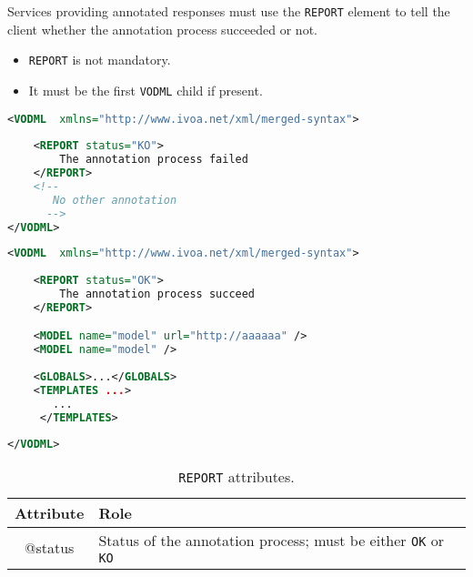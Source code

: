 Services providing annotated responses must use the \texttt{REPORT}  element to tell the client whether the annotation process succeeded or not.

\begin{itemize}
\item \texttt{REPORT} is not mandatory.
\item It must be the first \texttt{VODML} child if present.
\end{itemize}



\begin{lstlisting}[caption={\texttt{REPORT} example for an annotation failure.},language=XML]
<VODML	xmlns="http://www.ivoa.net/xml/merged-syntax">
	
	<REPORT status="KO">
	    The annotation process failed
	</REPORT>
	<!-- 
	   No other annotation
	  -->	
</VODML>
\end{lstlisting}

\begin{lstlisting}[caption={\texttt{REPORT} example for an valid annotation.},language=XML]
<VODML	xmlns="http://www.ivoa.net/xml/merged-syntax">
	
	<REPORT status="OK">
	    The annotation process succeed
	</REPORT>

	<MODEL name="model" url="http://aaaaaa" />
	<MODEL name="model" />
	
	<GLOBALS>...</GLOBALS>
	<TEMPLATES ...>
	   ...
	 </TEMPLATES>
	
</VODML>
\end{lstlisting}


\begin{table}[!htbp]
  \small
  \centering
  \begin{tabulary}{\linewidth}{|c|J|}       
    \hline 
         \textbf{Attribute} & 
         \textbf {Role}\\
    \hline
    \hline  
         @status  & 
        Status of the annotation process; must be either \texttt{OK} or \texttt{KO} \\
    \hline 
  \end{tabulary}
  \caption{\texttt{REPORT} attributes.} 
  \label{tbl:report-att}
\end{table}

